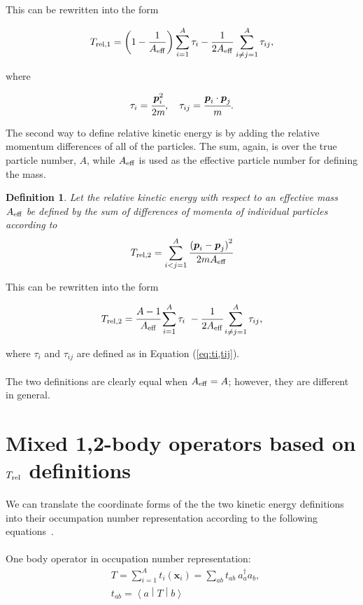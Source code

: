 \documentclass{article}
\def\aeff{A_{\rm{eff}}}
\def\trel{T_{\rm{rel}}}
\def\treli_#1{T_{\rm{rel},#1}}
\def\momvect{\boldsymbol{p}}
\def\posvect{\boldsymbol{x}}
\def\creop{a^{\dagger}}
\def\annop{a}
\def\matelt#1#2#3{\left\langle{#1}\middle|{#2}\middle|{#3}\right\rangle}
\newtheorem{definition}{Definition}[section]
\begin{document}
This can be rewritten into the form

\begin{equation}\label{eq:trel1}
  \treli_1 =
  \left(1-\frac{1}{\aeff}\right) \displaystyle\sum_{i=1}^A\tau_i
  - \frac{1}{2\aeff}
  \displaystyle\sum_{i\neq j=1}^A\tau_{ij},
\end{equation}

where

\begin{equation}\label{eq:ti,tij}
  \tau_i = \cfrac{\momvect_i^2}{2m}, \quad
  \tau_{ij} = \cfrac{\momvect_i\cdot\momvect_j}{m}.
\end{equation}

The second way to define relative kinetic energy is by adding the
relative momentum differences of all of the particles. The sum, again,
is over the true particle number, $A$, while $\aeff$ is used as
the effective particle number for defining the mass.

\begin{definition}\label{def:trel2}
  Let the relative kinetic energy with respect to an effective mass $\aeff$
  be defined by the sum of differences of momenta of individual particles
  according to
  \begin{equation*}
    \treli_2 = \displaystyle\sum_{i<j=1}^A
    \cfrac{{(\momvect_i-\momvect_j)}^2}{2m\aeff}
  \end{equation*}
\end{definition}

This can be rewritten into the form

\begin{equation}\label{eq:trel2}
  \treli_2 = \cfrac{A-1}{\aeff} \displaystyle\sum_{i=1}^A\tau_i
  ~-\cfrac{1}{2\aeff} \displaystyle\sum_{i\neq j=1}^A\tau_{ij},
\end{equation}

where $\tau_i$ and $\tau_{ij}$ are defined as in Equation (\ref{eq:ti,tij}).
\\\\
The two definitions are clearly equal when $\aeff=A$; however,
they are different in general.

\section{Mixed 1,2-body operators based on $\trel$ definitions}
We can translate the coordinate forms of the the two kinetic energy
definitions into their occumpation number representation according to
the following equations~\cite{suhonen}.
\\\\
One body operator in occupation number representation:
\begin{equation}\label{eq:ocn1bd}
  \begin{aligned}
    &T = \displaystyle\sum_{i=1}^A t_i(\posvect_i) =
    \displaystyle\sum_{ab}t_{ab}~\creop_a\annop_b,\\
    &t_{ab} = \matelt{a}{T}{b}
  \end{aligned}
\end{equation}
\end{document}

